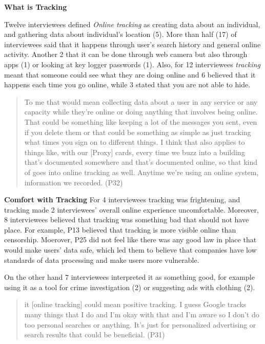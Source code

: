 \textbf{What is Tracking}

Twelve interviewees defined \textit{Online tracking} as creating data about an individual, and gathering data about individual's location (5). More than half (17) of interviewees said that it happens through user's search history and general online activity. Another 2 that it can be done through web camera but also through apps (1) or looking at key logger passwords (1). Also, for 12 interviewees  \textit{tracking} meant that someone could see what they are doing online and 6 believed that it happens each time you go online, while 3 stated that you are not able to hide.

\begin{quote}To me that would mean collecting data about a user in any service or any capacity while they're online or doing anything that involves being online. That could be something like keeping a lot of the messages you sent, even if you delete them or that could be something as simple as just tracking what times you sign on to different things. I think that also applies to things like, with our [Proxy] cards, every time we buzz into a building that's documented somewhere and that's documented online, so that kind of goes into online tracking as well. Anytime we're using an online system, information we recorded. (P32)\end{quote}



\textbf{Comfort with Tracking}
For 4 interviewees tracking was frightening, and tracking made 2 interviewees' overall online experience uncomfortable. Moreover, 8 interviewees believed that tracking was something bad that should not have place. For example, P13 believed that tracking is more visible online than censorship.
Moerover, P25 did not feel like there was any good law in place that would make users' data safe, which led them to believe that companies have low standards of data processing and make users more vulnerable. 

On the other hand 7 interviewees interpreted it as something good, for example using it as a tool for crime investigation (2) or suggesting ads with clothing (2). 

\begin{quote} it [online tracking] could mean positive tracking. I guess Google tracks many things that I do and I'm okay with that and I'm aware so I don't do too personal searches or anything. It's just for personalized advertising or search results that could be beneficial. (P31) \end{quote}


